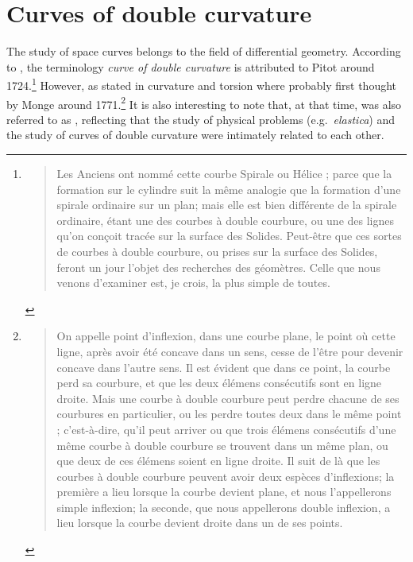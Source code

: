 
\section{Curves of double curvature}

The study of space curves belongs to the field of differential geometry. According to \cite[p.28]{Delcourt2007}, the terminology \emph{curve of double curvature} is attributed to Pitot around 1724.\footnote{\blockcquote[p.28]{Pitot1726}{Les Anciens ont nommé cette courbe Spirale ou Hélice ; parce que la formation sur le cylindre suit la même analogie que la formation d’une spirale ordinaire sur un plan; mais elle est bien différente de la spirale ordinaire, étant une des courbes à double courbure, ou une des lignes qu’on conçoit tracée sur la surface des Solides. Peut-être que ces sortes de courbes à double courbure, ou prises sur la surface des Solides, feront un jour l’objet des recherches des géomètres. Celle que nous venons d’examiner est, je crois, la plus simple de toutes.
}} However, as stated in \cite[p.321]{Coolidge2013} curvature and torsion where probably first thought by Monge around 1771.\footnote{\blockcquote[p.363]{Monge1809}{On appelle point d'inflexion, dans une courbe plane, le point où cette ligne, après avoir été concave dans un sens, cesse de l'être pour devenir concave dans l'autre sens. Il est évident que dans ce point, la courbe perd sa courbure, et que les deux élémens consécutifs sont en ligne droite. Mais une courbe à double courbure peut perdre chacune de ses courbures en particulier, ou les perdre toutes deux dans le même point ; c'est-à-dire, qu'il peut arriver ou que trois élémens consécutifs d'une même courbe à double courbure se trouvent dans un même plan, ou que deux de ces élémens soient en ligne droite. Il suit de là que les courbes à double courbure peuvent avoir deux espèces d'inflexions; la première a lieu lorsque la courbe devient plane, et nous l'appellerons simple inflexion; la seconde, que nous appellerons double inflexion, a lieu lorsque la courbe devient droite dans un de ses points.}.} It is also interesting to note that, at that time,  was also referred to as , reflecting that the study of physical problems (e.g.\ \emph{elastica}) and the study of curves of double curvature were intimately related to each other.

